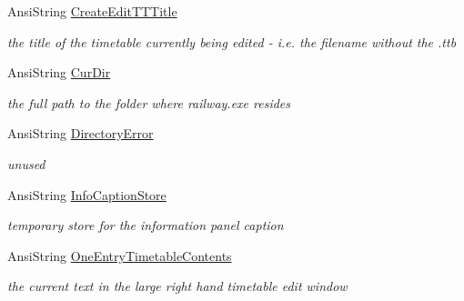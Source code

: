 \begin{DoxyCompactItemize}
\mbox{\label{class_t_interface_a65f647cf6a00083288ae3642cfd24c0e}} 
Ansi\+String \mbox{\hyperlink{class_t_interface_a65f647cf6a00083288ae3642cfd24c0e}{Create\+Edit\+T\+T\+Title}}
\begin{DoxyCompactList}\small\item\em the title of the timetable currently being edited -\/ i.\+e. the filename without the \textquotesingle{}.ttb\textquotesingle{} \end{DoxyCompactList}\item 
\mbox{\label{class_t_interface_a5cac77c0ad95e8218a047a7a6ade7fb7}} 
Ansi\+String \mbox{\hyperlink{class_t_interface_a5cac77c0ad95e8218a047a7a6ade7fb7}{Cur\+Dir}}
\begin{DoxyCompactList}\small\item\em the full path to the folder where railway.\+exe resides \end{DoxyCompactList}\item 
\mbox{\label{class_t_interface_a5f4678f1a03c0c6ed614433f24ca3891}} 
Ansi\+String \mbox{\hyperlink{class_t_interface_a5f4678f1a03c0c6ed614433f24ca3891}{Directory\+Error}}
\begin{DoxyCompactList}\small\item\em unused \end{DoxyCompactList}\item 
\mbox{\label{class_t_interface_adbc9c0949ca221c0b45835d086ca5b79}} 
Ansi\+String \mbox{\hyperlink{class_t_interface_adbc9c0949ca221c0b45835d086ca5b79}{Info\+Caption\+Store}}
\begin{DoxyCompactList}\small\item\em temporary store for the information panel caption \end{DoxyCompactList}\item 
\mbox{\label{class_t_interface_ac66012f63a57e6e1eab2e2d86b17309f}} 
Ansi\+String \mbox{\hyperlink{class_t_interface_ac66012f63a57e6e1eab2e2d86b17309f}{One\+Entry\+Timetable\+Contents}}
\begin{DoxyCompactList}\small\item\em the current text in the large right hand timetable edit window \end{DoxyCompactList}\item 

\end{DoxyCompactItemize}
